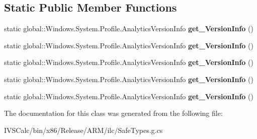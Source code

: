 \subsection*{Static Public Member Functions}
\begin{DoxyCompactItemize}
\item 
\mbox{\label{class_windows_1_1_system_1_1_profile_1_1_analytics_info_a453b47ff70c0b7c7397ce75e3100c08b}} 
static global\+::\+Windows.\+System.\+Profile.\+Analytics\+Version\+Info {\bfseries get\+\_\+\+Version\+Info} ()
\item 
\mbox{\label{class_windows_1_1_system_1_1_profile_1_1_analytics_info_a453b47ff70c0b7c7397ce75e3100c08b}} 
static global\+::\+Windows.\+System.\+Profile.\+Analytics\+Version\+Info {\bfseries get\+\_\+\+Version\+Info} ()
\item 
\mbox{\label{class_windows_1_1_system_1_1_profile_1_1_analytics_info_a453b47ff70c0b7c7397ce75e3100c08b}} 
static global\+::\+Windows.\+System.\+Profile.\+Analytics\+Version\+Info {\bfseries get\+\_\+\+Version\+Info} ()
\item 
\mbox{\label{class_windows_1_1_system_1_1_profile_1_1_analytics_info_a453b47ff70c0b7c7397ce75e3100c08b}} 
static global\+::\+Windows.\+System.\+Profile.\+Analytics\+Version\+Info {\bfseries get\+\_\+\+Version\+Info} ()
\item 
\mbox{\label{class_windows_1_1_system_1_1_profile_1_1_analytics_info_a453b47ff70c0b7c7397ce75e3100c08b}} 
static global\+::\+Windows.\+System.\+Profile.\+Analytics\+Version\+Info {\bfseries get\+\_\+\+Version\+Info} ()
\end{DoxyCompactItemize}


The documentation for this class was generated from the following file\+:\begin{DoxyCompactItemize}
\item 
I\+V\+S\+Calc/bin/x86/\+Release/\+A\+R\+M/ilc/Safe\+Types.\+g.\+cs\end{DoxyCompactItemize}
